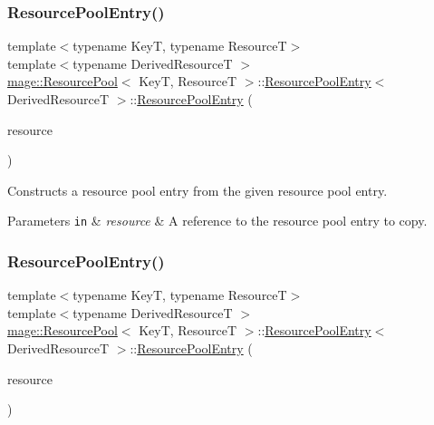 \subsubsection{\texorpdfstring{Resource\+Pool\+Entry()}{ResourcePoolEntry()}\hspace{0.1cm}{\footnotesize\ttfamily [2/3]}}
{\footnotesize\ttfamily template$<$typename KeyT, typename ResourceT$>$ \\
template$<$typename Derived\+ResourceT $>$ \\
\hyperlink{classmage_1_1_resource_pool}{mage\+::\+Resource\+Pool}$<$ KeyT, ResourceT $>$\+::\hyperlink{structmage_1_1_resource_pool_1_1_resource_pool_entry}{Resource\+Pool\+Entry}$<$ Derived\+ResourceT $>$\+::\hyperlink{structmage_1_1_resource_pool_1_1_resource_pool_entry}{Resource\+Pool\+Entry} (\begin{DoxyParamCaption}\item[{const \hyperlink{structmage_1_1_resource_pool_1_1_resource_pool_entry}{Resource\+Pool\+Entry}$<$ Derived\+ResourceT $>$ \&}]{resource }\end{DoxyParamCaption})\hspace{0.3cm}{\ttfamily [delete]}}

Constructs a resource pool entry from the given resource pool entry.


\begin{DoxyParams}[1]{Parameters}
\mbox{\tt in}  & {\em resource} & A reference to the resource pool entry to copy. \\
\hline
\end{DoxyParams}
\hypertarget{structmage_1_1_resource_pool_1_1_resource_pool_entry_a9a6d3bb435ebc41ca6f78709e4f4cd39}{}\label{structmage_1_1_resource_pool_1_1_resource_pool_entry_a9a6d3bb435ebc41ca6f78709e4f4cd39} 
\subsubsection{\texorpdfstring{Resource\+Pool\+Entry()}{ResourcePoolEntry()}\hspace{0.1cm}{\footnotesize\ttfamily [3/3]}}
{\footnotesize\ttfamily template$<$typename KeyT, typename ResourceT$>$ \\
template$<$typename Derived\+ResourceT $>$ \\
\hyperlink{classmage_1_1_resource_pool}{mage\+::\+Resource\+Pool}$<$ KeyT, ResourceT $>$\+::\hyperlink{structmage_1_1_resource_pool_1_1_resource_pool_entry}{Resource\+Pool\+Entry}$<$ Derived\+ResourceT $>$\+::\hyperlink{structmage_1_1_resource_pool_1_1_resource_pool_entry}{Resource\+Pool\+Entry} (\begin{DoxyParamCaption}\item[{\hyperlink{structmage_1_1_resource_pool_1_1_resource_pool_entry}{Resource\+Pool\+Entry}$<$ Derived\+ResourceT $>$ \&\&}]{resource }\end{DoxyParamCaption})}

